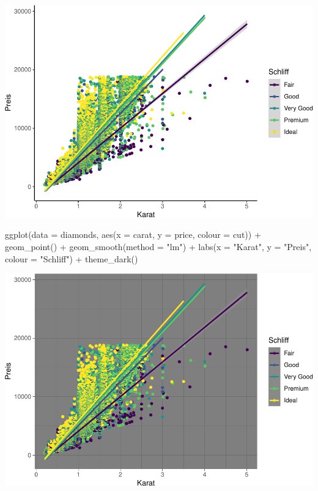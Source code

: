 \documentclass[
]{book}
\newenvironment{Shaded}{\begin{snugshade}}{\end{snugshade}}
\newcommand{\AttributeTok}[1]{\textcolor[rgb]{0.77,0.63,0.00}{#1}}
\newcommand{\FunctionTok}[1]{\textcolor[rgb]{0.00,0.00,0.00}{#1}}
\newcommand{\NormalTok}[1]{#1}
\newcommand{\SpecialCharTok}[1]{\textcolor[rgb]{0.00,0.00,0.00}{#1}}
\newcommand{\StringTok}[1]{\textcolor[rgb]{0.31,0.60,0.02}{#1}}
\begin{document}
\includegraphics{CFH_R_bookdown_files/figure-latex/unnamed-chunk-182-1.pdf}

\begin{Shaded}
\begin{Highlighting}[]
\FunctionTok{ggplot}\NormalTok{(}\AttributeTok{data =}\NormalTok{ diamonds, }\FunctionTok{aes}\NormalTok{(}\AttributeTok{x =}\NormalTok{ carat, }\AttributeTok{y =}\NormalTok{ price, }\AttributeTok{colour =}\NormalTok{ cut)) }\SpecialCharTok{+}
  \FunctionTok{geom\_point}\NormalTok{() }\SpecialCharTok{+}
  \FunctionTok{geom\_smooth}\NormalTok{(}\AttributeTok{method =} \StringTok{"lm"}\NormalTok{) }\SpecialCharTok{+}
  \FunctionTok{labs}\NormalTok{(}\AttributeTok{x =} \StringTok{"Karat"}\NormalTok{, }\AttributeTok{y =} \StringTok{"Preis"}\NormalTok{, }\AttributeTok{colour =} \StringTok{"Schliff"}\NormalTok{) }\SpecialCharTok{+}
  \FunctionTok{theme\_dark}\NormalTok{()}
\end{Highlighting}
\end{Shaded}

\includegraphics{CFH_R_bookdown_files/figure-latex/unnamed-chunk-183-1.pdf}
\end{document}
